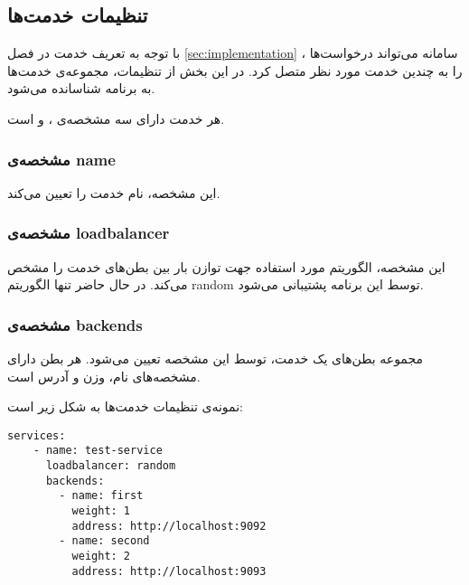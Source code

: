 \subsection*{تنظیمات خدمت‌ها}
با توجه به تعریف خدمت در فصل
\ref{sec:implementation}
، سامانه می‌تواند درخواست‌ها را به چندین خدمت مورد نظر متصل کرد. در این بخش از تنظیمات، مجموعه‌ی خدمت‌ها به برنامه شناسانده می‌شود.

هر خدمت دارای سه مشخصه‌ی ،  و  است.


\subsubsection*{مشخصه‌ی name}
این مشخصه‌، نام خدمت را تعیین می‌کند.

\subsubsection*{مشخصه‌ی loadbalancer}
این مشخصه‌، الگوریتم مورد استفاده جهت توازن بار بین بطن‌های خدمت‌ را مشخص می‌کند. در حال حاضر تنها الگوریتم random توسط این برنامه پشتیبانی می‌شود.

\subsubsection*{مشخصه‌ی backends}
مجموعه بطن‌های یک خدمت، توسط این مشخصه تعیین می‌شود. هر بطن دارای مشخصه‌های نام، وزن و آدرس است.

نمونه‌ی تنظیمات خدمت‌ها به شکل زیر است:

\begin{latin}
    \begin{lstlisting}
services:
    - name: test-service
      loadbalancer: random
      backends:
        - name: first
          weight: 1
          address: http://localhost:9092
        - name: second
          weight: 2
          address: http://localhost:9093
    \end{lstlisting}
\end{latin}

